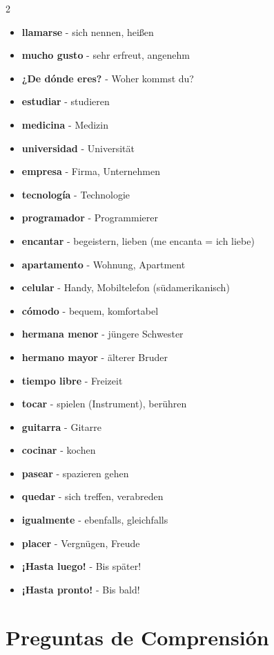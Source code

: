 \documentclass[12pt,a4paper]{article}
\begin{document}
\begin{multicols}{2}
\begin{itemize}[leftmargin=*]
    \item \textbf{llamarse} - sich nennen, heißen
    \item \textbf{mucho gusto} - sehr erfreut, angenehm
    \item \textbf{¿De dónde eres?} - Woher kommst du?
    \item \textbf{estudiar} - studieren
    \item \textbf{medicina} - Medizin
    \item \textbf{universidad} - Universität
    \item \textbf{empresa} - Firma, Unternehmen
    \item \textbf{tecnología} - Technologie
    \item \textbf{programador} - Programmierer
    \item \textbf{encantar} - begeistern, lieben (me encanta = ich liebe)
    \item \textbf{apartamento} - Wohnung, Apartment
    \item \textbf{celular} - Handy, Mobiltelefon (südamerikanisch)
    \item \textbf{cómodo} - bequem, komfortabel
    \item \textbf{hermana menor} - jüngere Schwester
    \item \textbf{hermano mayor} - älterer Bruder
    \item \textbf{tiempo libre} - Freizeit
    \item \textbf{tocar} - spielen (Instrument), berühren
    \item \textbf{guitarra} - Gitarre
    \item \textbf{cocinar} - kochen
    \item \textbf{pasear} - spazieren gehen
    \item \textbf{quedar} - sich treffen, verabreden
    \item \textbf{igualmente} - ebenfalls, gleichfalls
    \item \textbf{placer} - Vergnügen, Freude
    \item \textbf{¡Hasta luego!} - Bis später!
    \item \textbf{¡Hasta pronto!} - Bis bald!
\end{itemize}
\end{multicols}

\newpage

\section*{Preguntas de Comprensión}
\end{document}
